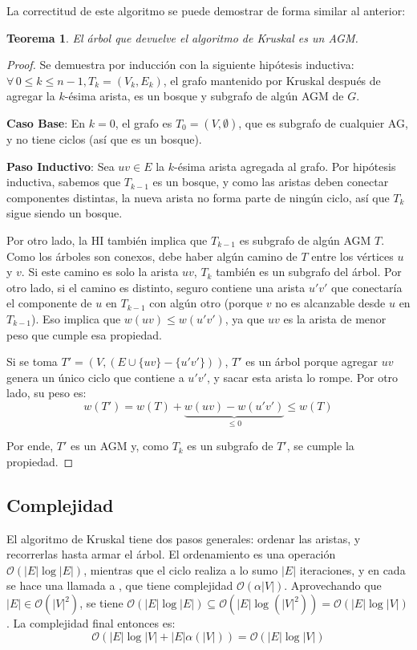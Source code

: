 \documentclass[a4paper]{report}
\newcommand{\BigO}[1]{\ensuremath{\mathcal{O}(#1)}}
\newtheorem*{theorem*}{Teorema}
\begin{document}
La correctitud de este algoritmo se puede demostrar de forma similar al anterior:
\begin{theorem*}
    El árbol que devuelve el algoritmo de Kruskal es un AGM.
\end{theorem*}
\begin{proof}
    Se demuestra por inducción con la siguiente hipótesis inductiva: $\forall\,0 \leq k \leq n - 1, T_k = (V_k, E_k)$, el grafo mantenido por Kruskal después de agregar la $k$-ésima arista, es un bosque y subgrafo de algún AGM de $G$.

    \textbf{Caso Base}: En $k = 0$, el grafo es $T_0 = (V, \emptyset)$, que es subgrafo de cualquier AG, y no tiene ciclos (así que es un bosque).

    \textbf{Paso Inductivo}: Sea $uv \in E$ la $k$-ésima arista agregada al grafo. Por hipótesis inductiva, sabemos que $T_{k - 1}$ es un bosque, y como las aristas deben conectar componentes distintas, la nueva arista no forma parte de ningún ciclo, así que $T_k$ sigue siendo un bosque.

    Por otro lado, la HI también implica que $T_{k - 1}$ es subgrafo de algún AGM $T$. Como los árboles son conexos, debe haber algún camino de $T$ entre los vértices $u$ y $v$. Si este camino es solo la arista $uv$, $T_k$ también es un subgrafo del árbol. Por otro lado, si el camino es distinto, seguro contiene una arista $u'v'$ que conectaría el componente de $u$ en $T_{k - 1}$ con algún otro (porque $v$ no es alcanzable desde $u$ en $T_{k - 1}$). Eso implica que $w(uv) \leq w(u'v')$, ya que $uv$ es la arista de menor peso que cumple esa propiedad.

    Si se toma $T' = (V, (E \cup \{uv\} - \{u'v'\}))$, $T'$ es un árbol porque agregar $uv$ genera un único ciclo que contiene a $u'v'$, y sacar esta arista lo rompe. Por otro lado, su peso es:
    $$w(T') = w(T) + \underbrace{w(uv) - w(u'v')}_{\leq 0} \leq w(T)$$

    Por ende, $T'$ es un AGM y, como $T_k$ es un subgrafo de $T'$, se cumple la propiedad.

\end{proof}

\subsection{Complejidad}

El algoritmo de Kruskal tiene dos pasos generales: ordenar las aristas, y recorrerlas hasta armar el árbol. El ordenamiento es una operación \BigO{|E|\log{|E|}}, mientras que el ciclo realiza a lo sumo $|E|$ iteraciones, y en cada se hace una llamada a , que tiene complejidad \BigO{\alpha{|V|}}. Aprovechando que $|E| \in \BigO{|V|^2}$, se tiene $\BigO{|E|\log{|E|}} \subseteq \BigO{|E|\log{(|V|^2)}} = \BigO{|E|\log{|V|}}$. La complejidad final entonces es:
$$\BigO{|E|\log{|V|} + |E|\alpha(|V|)} = \BigO{|E|\log{|V|}}$$
\end{document}
